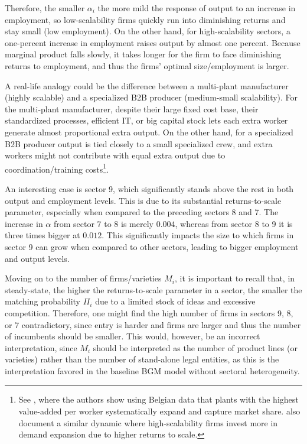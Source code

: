 \documentclass[a4paper,12pt]{article} %
\numberwithin{equation}{section} %
\numberwithin{figure}{section}
\numberwithin{table}{section}
\begin{document}
Therefore, the smaller $\alpha_i$ the more mild the response of output to an increase in employment, 
so low-scalability firms quickly run into diminishing returns and stay small (low employment). On the other hand, 
for high-scalability sectors, a one-percent increase in employment raises output by almost one percent. Because marginal product falls slowly,
it takes longer for the firm to face diminishing returns to employment, and thus the firms' optimal size/employment is larger.

A real-life analogy could be the difference between a multi-plant manufacturer (highly scalable) and a specialized B2B producer 
(medium-small scalability). For the multi-plant manufacturer, despite their large fixed cost base, their standardized processes, efficient IT, 
or big capital stock lets each extra worker generate almost proportional extra output. On the other hand, for a specialized B2B producer output
is tied closely to a small specialized crew, and extra workers might not contribute with equal extra output due to coordination/training costs\footnote{ See \textcite{baqaee2024darwinian}, where the authors show using Belgian data that 
plants with the highest value-added per worker systematically expand and capture market share. \textcite{sedlavcek2017growth} also document a similar dynamic where 
high-scalability firms invest more in demand expansion due to higher returns to scale.}.

An interesting case is sector 9, which significantly stands above the rest in both output and employment levels. This is due to its substantial
returns-to-scale parameter, especially when compared to the preceding sectors 8 and 7. The increase in $\alpha$ from sector 7 to 8 
is merely $0.004$, whereas from sector 8 to 9 it is three times bigger at $0.012$. This significantly impacts the size to which firms in 
sector 9 can grow when compared to other sectors, leading to bigger employment and output levels.

Moving on to the number of firms/varieties $M_i$, it is important to recall that, in steady-state, the higher the returns-to-scale parameter
in a sector, the smaller the matching probability $\Pi_i$ due to a limited stock of ideas and excessive competition. Therefore, one might find
the high number of firms in sectors 9, 8, or 7 contradictory, since entry is harder and firms are larger and thus the number of incumbents should
be smaller. This would, however, be an incorrect interpretation, since $M_i$ should be interpreted as the number of product lines (or varieties) 
rather than the number of stand-alone legal entities, as this is the interpretation favored in the baseline BGM model without 
sectoral heterogeneity. 
\end{document}
